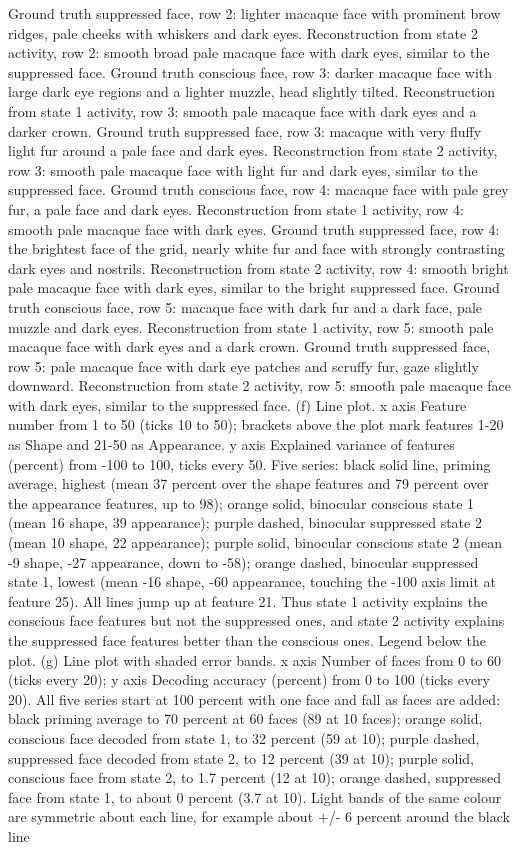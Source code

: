 \documentclass{article}
\begin{document}
Ground truth suppressed face, row 2: lighter macaque face with prominent brow ridges, pale cheeks with whiskers and dark eyes. Reconstruction from state 2 activity, row 2: smooth broad pale macaque face with dark eyes, similar to the suppressed face. Ground truth conscious face, row 3: darker macaque face with large dark eye regions and a lighter muzzle, head slightly tilted. Reconstruction from state 1 activity, row 3: smooth pale macaque face with dark eyes and a darker crown. Ground truth suppressed face, row 3: macaque with very fluffy light fur around a pale face and dark eyes. Reconstruction from state 2 activity, row 3: smooth pale macaque face with light fur and dark eyes, similar to the suppressed face. Ground truth conscious face, row 4: macaque face with pale grey fur, a pale face and dark eyes. Reconstruction from state 1 activity, row 4: smooth pale macaque face with dark eyes. Ground truth suppressed face, row 4: the brightest face of the grid, nearly white fur and face with strongly contrasting dark eyes and nostrils. Reconstruction from state 2 activity, row 4: smooth bright pale macaque face with dark eyes, similar to the bright suppressed face. Ground truth conscious face, row 5: macaque face with dark fur and a dark face, pale muzzle and dark eyes. Reconstruction from state 1 activity, row 5: smooth pale macaque face with dark eyes and a dark crown. Ground truth suppressed face, row 5: pale macaque face with dark eye patches and scruffy fur, gaze slightly downward. Reconstruction from state 2 activity, row 5: smooth pale macaque face with dark eyes, similar to the suppressed face. (f) Line plot. x axis Feature number from 1 to 50 (ticks 10 to 50); brackets above the plot mark features 1-20 as Shape and 21-50 as Appearance. y axis Explained variance of features (percent) from -100 to 100, ticks every 50. Five series: black solid line, priming average, highest (mean 37 percent over the shape features and 79 percent over the appearance features, up to 98); orange solid, binocular conscious state 1 (mean 16 shape, 39 appearance); purple dashed, binocular suppressed state 2 (mean 10 shape, 22 appearance); purple solid, binocular conscious state 2 (mean -9 shape, -27 appearance, down to -58); orange dashed, binocular suppressed state 1, lowest (mean -16 shape, -60 appearance, touching the -100 axis limit at feature 25). All lines jump up at feature 21. Thus state 1 activity explains the conscious face features but not the suppressed ones, and state 2 activity explains the suppressed face features better than the conscious ones. Legend below the plot. (g) Line plot with shaded error bands. x axis Number of faces from 0 to 60 (ticks every 20); y axis Decoding accuracy (percent) from 0 to 100 (ticks every 20). All five series start at 100 percent with one face and fall as faces are added: black priming average to 70 percent at 60 faces (89 at 10 faces); orange solid, conscious face decoded from state 1, to 32 percent (59 at 10); purple dashed, suppressed face decoded from state 2, to 12 percent (39 at 10); purple solid, conscious face from state 2, to 1.7 percent (12 at 10); orange dashed, suppressed face from state 1, to about 0 percent (3.7 at 10). Light bands of the same colour are symmetric about each line, for example about +/- 6 percent around the black line 
\end{document}
